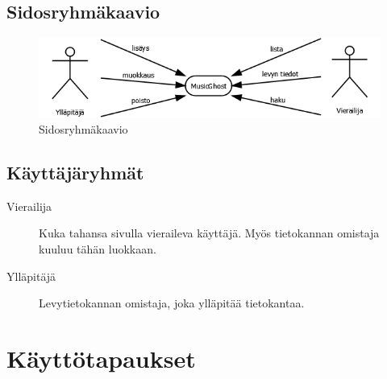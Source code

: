 \documentclass[a4paper,12pt]{report}
\begin{document}
\subsection{Sidosryhmäkaavio}

\vspace{1em}
\begin{figure}[H]
  \begin{center}
    \includegraphics[width=\textwidth]{diagrams/sidosryhmakaavio}
  \end{center}
  \caption{Sidosryhmäkaavio}
\end{figure}

\subsection{Käyttäjäryhmät}
\begin{description}
\item[Vierailija] Kuka tahansa sivulla vieraileva käyttäjä. Myös tietokannan
omistaja kuuluu tähän luokkaan.
\item[Ylläpitäjä] Levytietokannan omistaja,
joka ylläpitää tietokantaa.
\end{description}

\section{Käyttötapaukset}
\end{document}
